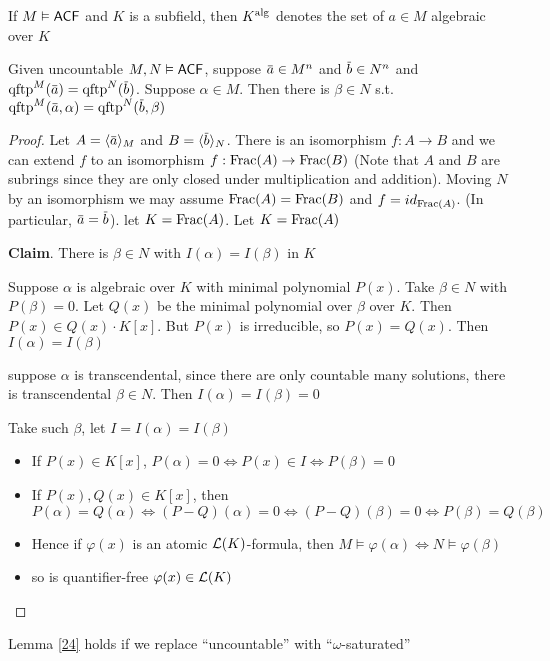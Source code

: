 \documentclass[11pt]{article}
\begin{document}
If \(M\vDash\textsf{ACF}\) and \(K\) is a subfield, then \(K^{\operatorname{\text{alg}}}\) denotes the set of \(a\in M\) algebraic
over \(K\)

\begin{lemma}[]
\label{24}
Given uncountable \(M,N\vDash\textsf{ACF}\), suppose \(\bara\in M^n\) and \(\barb\in N^n\)
and \(\qftp^M(\bara)=\qftp^N(\barb)\). Suppose \(\alpha\in M\). Then there is \(\beta\in N\) s.t. \(\qftp^M(\bara,\alpha)=\qftp^N(\barb,\beta)\)
\end{lemma}

\begin{proof}
Let \(A=\la\bara\ra_M\) and \(B=\la\barb\ra_N\). There is an isomorphism \(f:A\to B\) and we can
extend \(f\) to an isomorphism \(f:\operatorname{Frac}(A)\to\operatorname{Frac}(B)\) (Note that \(A\) and \(B\) are subrings
since they are only closed under multiplication and addition). Moving \(N\) by an isomorphism we may
assume \(\operatorname{Frac}(A)=\operatorname{Frac}(B)\) and \(f=id_{\operatorname{Frac}(A)}\). (In particular, \(\bara=\barb\)).
let \(K=\operatorname{Frac}(A)\). Let \(K=\operatorname{Frac}(A)\)

\textbf{Claim}. There is \(\beta\in N\) with \(I(\alpha)=I(\beta)\) in \(K\)

Suppose \(\alpha\) is algebraic over \(K\) with minimal polynomial \(P(x)\). Take \(\beta\in N\)
with \(P(\beta)=0\). Let \(Q(x)\) be the minimal polynomial over \(\beta\) over \(K\).
Then \(P(x)\in Q(x)\cdot K[x]\). But \(P(x)\) is irreducible, so \(P(x)=Q(x)\). Then \(I(\alpha)=I(\beta)\)

suppose \(\alpha\) is transcendental, since there are only countable many solutions, there is
transcendental \(\beta\in N\). Then \(I(\alpha)=I(\beta)=0\)

Take such \(\beta\), let \(I=I(\alpha)=I(\beta)\)
\begin{itemize}
\item If \(P(x)\in K[x]\), \(P(\alpha)=0\Leftrightarrow P(x)\in I\Leftrightarrow P(\beta)=0\)
\item If \(P(x),Q(x)\in K[x]\), then \(P(\alpha)=Q(\alpha)\Leftrightarrow(P-Q)(\alpha)=0\Leftrightarrow(P-Q)(\beta)=0\Leftrightarrow P(\beta)=Q(\beta)\)
\item Hence if \(\varphi(x)\) is an atomic \(\mathcal{L}(K)\)-formula, then \(M\vDash\varphi(\alpha)\Leftrightarrow N\vDash\varphi(\beta)\)
\item so is quantifier-free \(\varphi(x)\in\mathcal{L}(K)\)
\end{itemize}
\end{proof}

\begin{lemma}[]
Lemma \ref{24} holds if we replace ``uncountable'' with ``\(\omega\)-saturated''
\end{lemma}
\end{document}
